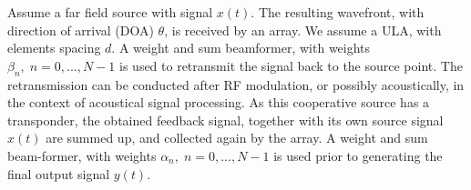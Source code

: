 Assume a far field source with signal $x(t)$. 
The resulting wavefront, with direction of arrival (DOA) $\theta$, is received by an array. 
We assume a ULA, with elements spacing $d$. A weight and sum beamformer, with weights $\beta_n,\;n=0,...,N-1$  is used to retransmit the signal back to the source point. 
The retransmission can be conducted after RF modulation, or possibly acoustically, in the context of acoustical signal processing. 
As this cooperative source has a transponder, the obtained feedback signal, together with its own source signal $x(t)$ are summed up, and collected again by the array. 
A weight and sum beam-former, with weights $\alpha_n,\;n=0,...,N-1$ is used prior to generating the final output signal $y(t)$.